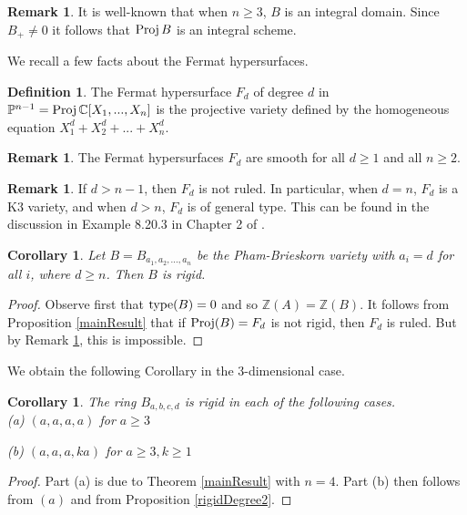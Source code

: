 \documentclass[12pt]{amsart}
\theoremstyle{plain}
\newtheorem{corollary}[subsection]{Corollary}
\theoremstyle{definition}
\newtheorem{definition}[subsection]{Definition}
\newtheorem{remark}[subsection]{Remark}
\newcommand{\Proj}{		\operatorname{{\rm Proj}}}
\newcommand{\type}{		\operatorname{{\rm type}}}
\newcommand{\Integ}{\ensuremath{\mathbb{Z}}}
\newcommand{\Comp}{\ensuremath{\mathbb{C}}}
\newcommand{\proj}{\ensuremath{\mathbb{P}}}
\begin{document}
\begin{remark} It is well-known that when $n \geq 3$, $B$ is an integral domain. Since $B_+ \neq 0$ it follows that $\Proj B$ is an integral scheme.
\end{remark}

We recall a few facts about the Fermat hypersurfaces. 

\begin{definition} The Fermat hypersurface $F_d$ of degree $d$ in $\proj^{n-1} = \Proj \Comp[X_1, ..., X_n]$ is the projective variety defined by the homogeneous equation $X_1^d + X_2^d + ... + X_n^d$.  
\end{definition}

\begin{remark} The Fermat hypersurfaces $F_d$ are smooth for all $d \geq 1$ and all $n \geq 2$. 
\end{remark}
\begin{remark} \label{notRuled}
	If $d > n-1$, then $F_d$ is not ruled. In particular, when $d=n$, $F_d$ is a K3 variety, and when $d > n$, $F_d$ is of general type. This can be found in the discussion in Example 8.20.3 in Chapter 2 of \cite{Hartshorne}. 
\end{remark}	

\begin{corollary} Let $B = B_{a_1,a_2,...,a_n}$ be the Pham-Brieskorn variety with $a_i = d$ for all $i$, where $d \geq n$. Then $B$ is rigid. 
\end{corollary}

\begin{proof} Observe first that $\type(B) = 0$ and so $\Integ(A) = \Integ(B)$. It follows from Proposition \ref{mainResult} that if $\Proj(B) = F_d$ is not rigid, then $F_d$ is ruled. But by Remark \ref{notRuled}, this is impossible. 
\end{proof}

We obtain the following Corollary in the 3-dimensional case. 

\begin{corollary}
	The ring $B_{a,b,c,d}$ is rigid in each of the following cases.
	\\
	
	(a) $(a,a,a,a)$ for $a \geq 3$
	
	(b) $(a,a,a,ka)$ for $a \geq 3, k \geq 1$
\end{corollary}
\begin{proof}
	Part (a) is due to Theorem \ref{mainResult} with $n = 4$. Part (b) then follows from $(a)$ and from Proposition \ref{rigidDegree2}. 
\end{proof}	
	
        








\end{document}

